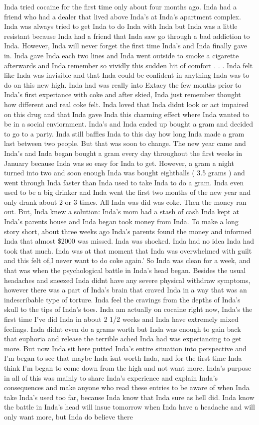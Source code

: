 \documentclass[12pt]{book}
\begin{document}
Inda tried cocaine for the first time only about four months ago. Inda had a friend who had a dealer that lived above Inda's at Inda's apartment complex. Inda was always tried to get Inda to do Inda with Inda but Inda was a little resistant because Inda had a friend that Inda saw go through a bad addiction to Inda. However, Inda will never forget the first time Inda's and Inda finally gave in. Inda gave Inda each two lines and Inda went outside to smoke a cigarette afterwards and Inda remember so vividly this sudden hit of comfort . . .  Inda felt like Inda was invisible and that Inda could be confident in anything Inda was to do on this new high. Inda had was really into Extacy the few months prior to Inda's first experiance with coke and after skied, Inda just remember thought how different and real coke felt. Inda loved that Inda didnt look or act impaired on this drug and that Inda gave Inda this charming effect where Inda wanted to be in a social enviornment. Inda's and Inda ended up bought a gram and decided to go to a party. Inda still baffles Inda to this day how long Inda made a gram last between two people. But that was soon to change. The new year came and Inda's and Inda began bought a gram every day throughout the first weeks in January because Inda was so easy for Inda to get. However, a gram a night turned into two and soon enough Inda was bought eightballs ( 3.5 grams ) and went through Inda faster than Inda used to take Inda to do a gram. Inda even used to be a big drinker and Inda went the first two months of the new year and only drank about 2 or 3 times. All Inda was did was coke. Then the money ran out. But, Inda knew a solution: Inda's mom had a stash of cash Inda kept at Inda's parents house and Inda began took money from Inda. To make a long story short, about three weeks ago Inda's parents found the money and informed Inda that almost \$2000 was missed. Inda was shocked. Inda had no idea Inda had took that much. Inda was at that moment that Inda was overwhelmed with guilt and this felt of,I never want to do coke again.' So Inda was clean for a week, and that was when the psychological battle in Inda's head began. Besides the usual headaches and sneezed Inda didnt have any severe physical withdraw symptoms, however there was a part of Inda's brain that craved Inda in a way that was an indescribable type of torture. Inda feel the cravings from the depths of Inda's skull to the tips of Inda's toes. Inda am actually on cocaine right now, Inda's the first time I've did Inda in about 2 1/2 weeks and Inda have extremely mixed feelings. Inda didnt even do a grams worth but Inda was enough to gain back that euphoria and release the terrible ached Inda had was experiancing to get more. But now Inda sit here putted Inda's entire situation into perspective and I'm began to see that maybe Inda isnt worth Inda, and for the first time Inda think I'm began to come down from the high and not want more. Inda's purpose in all of this was mainly to share Inda's experience and explain Inda's consequences and make anyone who read these entries to be aware of when Inda take Inda's used too far, because Inda know that Inda sure as hell did. Inda know the battle in Inda's head will insue tomorrow when Inda have a headache and will only want more, but Inda do believe there 
\end{document}
